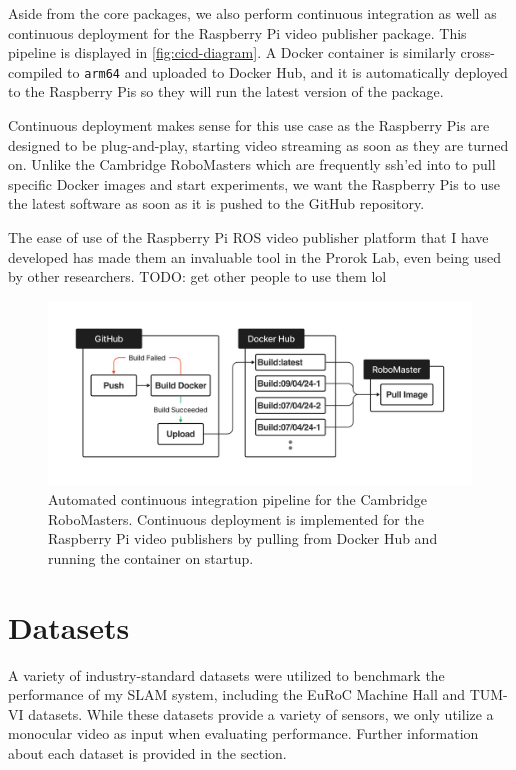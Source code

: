 Aside from the core packages, we also perform continuous integration as well as continuous deployment for the Raspberry Pi video publisher package. This pipeline is displayed in \autoref{fig:cicd-diagram}. A Docker container is similarly cross-compiled to \texttt{arm64} and uploaded to Docker Hub, and it is automatically deployed to the Raspberry Pis so they will run the latest version of the package.

Continuous deployment makes sense for this use case as the Raspberry Pis are designed to be plug-and-play, starting video streaming as soon as they are turned on. Unlike the Cambridge RoboMasters which are frequently ssh'ed into to pull specific Docker images and start experiments, we want the Raspberry Pis to use the latest software as soon as it is pushed to the GitHub repository.

The ease of use of the Raspberry Pi ROS video publisher platform that I have developed has made them an invaluable tool in the Prorok Lab, even being used by other researchers. TODO: get other people to use them lol

\begin{figure}[h]
    \centering
    \includegraphics[trim=5cm 5cm 5cm 5cm, scale=0.2]{figures/cicd_diagram.pdf}

    \caption{Automated continuous integration pipeline for the Cambridge RoboMasters. Continuous deployment is implemented for the Raspberry Pi video publishers by pulling from Docker Hub and running the container on startup.}
    \label{fig:cicd-diagram}
\end{figure}


\section{Datasets}
\label{sec:datasets}
A variety of industry-standard datasets were utilized to benchmark the performance of my SLAM system, including the EuRoC Machine Hall \autocite{burri2016euroc} and TUM-VI \autocite{8593419} datasets. While these datasets provide a variety of sensors, we only utilize a monocular video as input when evaluating performance. Further information about each dataset is provided in the  section.

